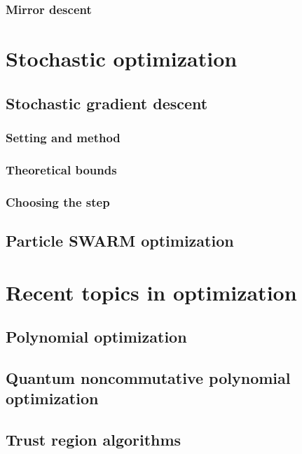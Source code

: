 \documentclass[12pt,openany,oneside]{book}
\theoremstyle{definition}
\numberwithin{definition}{section}
\numberwithin{theorem}{section}
\numberwithin{corollary}{section}
\numberwithin{proposition}{section}
\numberwithin{notation}{section}
\numberwithin{remark}{section}
\numberwithin{hypothesis}{section}
\begin{document}
\subsection{Mirror descent}

\chapter{Stochastic optimization}

\section{Stochastic gradient descent}
\subsection{Setting and method}
\subsection{Theoretical bounds}
\subsection{Choosing the step}
\section{Particle SWARM optimization}

\chapter{Recent topics in optimization}

\section{Polynomial optimization}
\section{Quantum noncommutative polynomial optimization}
\section{Trust region algorithms}
\end{document}
